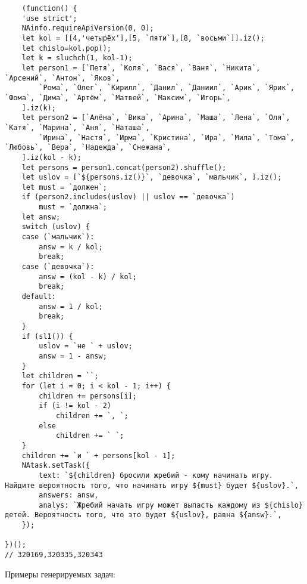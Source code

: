 \vspace{\baselineskip}

\vspace{\baselineskip}

\vspace{\baselineskip}
\vspace{\baselineskip}

\begin{lstlisting}
	(function() {
	'use strict';
	NAinfo.requireApiVersion(0, 0);
	let kol = [[4,'четырёх'],[5, `пяти`],[8, `восьми`]].iz();
	let chislo=kol.pop();
	let k = sluchch(1, kol-1);
	let person1 = [`Петя`, `Коля`, `Вася`, `Ваня`, `Никита`, `Арсений`, `Антон`, `Яков`,
		`Рома`, `Олег`, `Кирилл`, `Данил`, `Даниил`, `Арик`, `Ярик`, `Фома`, `Дима`, `Артём`, `Матвей`, `Максим`, `Игорь`,
	].iz(k);
	let person2 = [`Алёна`, `Вика`, `Арина`, `Маша`, `Лена`, `Оля`, `Катя`, `Марина`, `Аня`, `Наташа`,
		`Ирина`, `Настя`, `Ирма`, `Кристина`, `Ира`, `Мила`, `Тома`, `Любовь`, `Вера`, `Надежда`, `Снежана`,
	].iz(kol - k);
	let persons = person1.concat(person2).shuffle();
	let uslov = [`${persons.iz()}`, `девочка`, `мальчик`, ].iz();
	let must = `должен`;
	if (person2.includes(uslov) || uslov == `девочка`)
		must = `должна`;
	let answ;
	switch (uslov) {
	case (`мальчик`):
		answ = k / kol;
		break;
	case (`девочка`):
		answ = (kol - k) / kol;
		break;
	default:
		answ = 1 / kol;
		break;
	}
	if (sl1()) {
		uslov = `не ` + uslov;
		answ = 1 - answ;
	}
	let children = ``;
	for (let i = 0; i < kol - 1; i++) {
		children += persons[i];
		if (i != kol - 2)
			children += `, `;
		else
			children += ` `;
	}
	children += `и ` + persons[kol - 1];
	NAtask.setTask({
		text: `${children} бросили жребий - кому начинать игру. Найдите вероятность того, что начинать игру ${must} будет ${uslov}.`,
		answers: answ,
		analys: `Жребий начать игру может выпасть каждому из ${chislo} детей. Вероятность того, что это будет ${uslov}, равна ${answ}.`,
	});

})();
// 320169,320335,320343
\end{lstlisting}
Примеры генерируемых задач:

